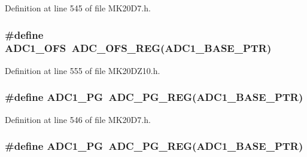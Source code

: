 Definition at line 545 of file M\+K20\+D7.\+h.

\subsubsection[{\texorpdfstring{A\+D\+C1\+\_\+\+O\+FS}{ADC1_OFS}}]{\setlength{\rightskip}{0pt plus 5cm}\#define A\+D\+C1\+\_\+\+O\+FS~{\bf A\+D\+C\+\_\+\+O\+F\+S\+\_\+\+R\+EG}({\bf A\+D\+C1\+\_\+\+B\+A\+S\+E\+\_\+\+P\+TR})}\hypertarget{group___a_d_c___register___accessor___macros_gacd6ca988aa9514cad8a02e6a2fab975c}{}\label{group___a_d_c___register___accessor___macros_gacd6ca988aa9514cad8a02e6a2fab975c}


Definition at line 555 of file M\+K20\+D\+Z10.\+h.

\subsubsection[{\texorpdfstring{A\+D\+C1\+\_\+\+PG}{ADC1_PG}}]{\setlength{\rightskip}{0pt plus 5cm}\#define A\+D\+C1\+\_\+\+PG~{\bf A\+D\+C\+\_\+\+P\+G\+\_\+\+R\+EG}({\bf A\+D\+C1\+\_\+\+B\+A\+S\+E\+\_\+\+P\+TR})}\hypertarget{group___a_d_c___register___accessor___macros_ga16df01cc392a34c109178ad4db48a27d}{}\label{group___a_d_c___register___accessor___macros_ga16df01cc392a34c109178ad4db48a27d}


Definition at line 546 of file M\+K20\+D7.\+h.

\subsubsection[{\texorpdfstring{A\+D\+C1\+\_\+\+PG}{ADC1_PG}}]{\setlength{\rightskip}{0pt plus 5cm}\#define A\+D\+C1\+\_\+\+PG~{\bf A\+D\+C\+\_\+\+P\+G\+\_\+\+R\+EG}({\bf A\+D\+C1\+\_\+\+B\+A\+S\+E\+\_\+\+P\+TR})}\hypertarget{group___a_d_c___register___accessor___macros_ga16df01cc392a34c109178ad4db48a27d}{}\label{group___a_d_c___register___accessor___macros_ga16df01cc392a34c109178ad4db48a27d}


